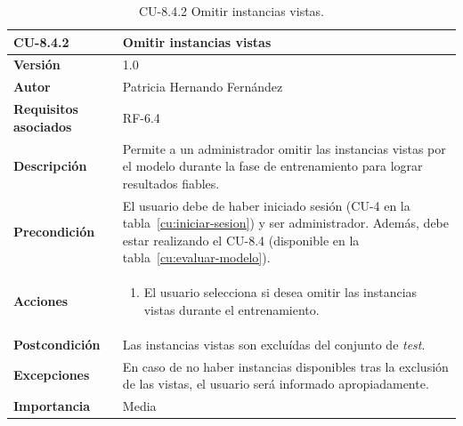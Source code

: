 \begin{table}[p]
	\centering
	\begin{tabularx}{\linewidth}{ p{} p{} }
		\toprule
		\textbf{CU-8.4.2}    & \textbf{Omitir instancias vistas}\\
		\toprule
		\textbf{Versión}              & 1.0    \\
		\textbf{Autor}                & Patricia Hernando Fernández \\
		\textbf{Requisitos asociados} & RF-6.4 \\
		\textbf{Descripción}          & Permite a un administrador omitir las instancias vistas por el modelo durante la fase de entrenamiento para lograr resultados fiables.\\
		\textbf{Precondición}         & El usuario debe de haber iniciado sesión (CU-4 en la tabla~\ref{cu:iniciar-sesion}) y ser administrador. Además, debe estar realizando el CU-8.4 (disponible en la tabla~\ref{cu:evaluar-modelo}). \\
		\textbf{Acciones}             &
		\begin{enumerate}
			\def\labelenumi{\arabic{enumi}.}
			\tightlist
			\item El usuario selecciona si desea omitir las instancias vistas durante el entrenamiento.
		\end{enumerate}\\
		\textbf{Postcondición}        & Las instancias vistas son excluídas del conjunto de \textit{test}.\\
		\textbf{Excepciones}          & En caso de no haber instancias disponibles tras la exclusión de las vistas, el usuario será informado apropiadamente.\\
		\textbf{Importancia}          & Media \\
		\bottomrule
	\end{tabularx}
	\caption{CU-8.4.2 Omitir instancias vistas.}
	\label{cu:omitir-vistas}
\end{table}







